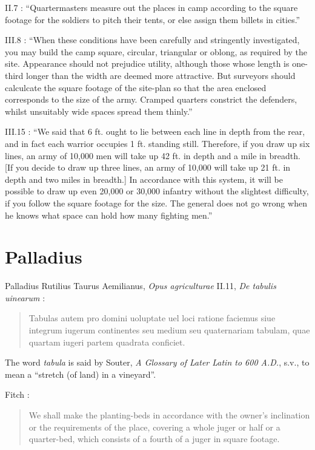 \documentclass{amsart}
\theoremstyle{definition}
\begin{document}
II.7 \cite[pp.~38--39]{vegetius}: ``Quartermasters measure out the places in camp according to the square footage
for the soldiers to pitch their tents, or else assign them billets in cities.''

III.8 \cite[p.~80]{vegetius}: ``When these conditions have been carefully and stringently investigated, you may build
the camp square, circular, triangular or oblong, as required by the site. Appearance should not prejudice utility, although those
whose length is one-third longer than the width are deemed more attractive. But surveyors should calculcate
the square footage of the site-plan so that the area enclosed corresponds to the size of the army. Cramped quarters
constrict the defenders, whilst unsuitably wide spaces spread them thinly.''

III.15 \cite[p.~97]{vegetius}: ``We said that 6 ft. ought to lie between each line in depth from the rear, and in fact each
warrior occupies 1 ft. standing still. Therefore, if you draw up six lines, an army of 10,000 men will take up 42 ft.
in depth and a mile in breadth. [If you decide to draw up three lines, an army of 10,000 will take up 21 ft. in depth and two
miles in breadth.] In accordance with this system, it will be possible to draw up even 20,000 or 30,000 infantry without the slightest
difficulty, if you follow the square footage for the size. The general does not go wrong when he knows what space
can hold how many fighting men.'' 







\section{Palladius}
Palladius Rutilius Taurus Aemilianus, {\em Opus agriculturae} II.11, {\em De tabulis uinearum} \cite[p.~54]{palladii}:

\begin{quote}
Tabulas autem pro domini uoluptate uel loci ratione
faciemus siue integrum iugerum continentes seu medium
seu quaternariam tabulam, quae quartam iugeri partem
quadrata conficiet.
\end{quote}

The word {\em tabula} is said by Souter, {\em A Glossary of Later Latin to 600 A.D.}, s.v., to mean a ``stretch (of land) in a vineyard''.

Fitch \cite[p.~75]{fitch}:

\begin{quote}
We shall make the planting-beds in accordance with the owner's inclination or the requirements of the place, covering a whole juger or half or a quarter-bed, which consists of a fourth of a juger in square footage. 
\end{quote}
\end{document}
